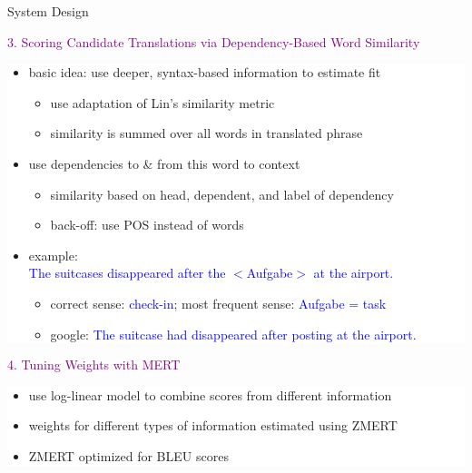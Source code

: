 \documentclass[final,t]{beamer}
\begin{document}
\begin{frame}{}
\begin{columns}[t]
\begin{column}{.47\linewidth}
\begin{block}{System Design}


\begin{center}
  \textcolor{purple}{3. Scoring Candidate Translations via Dependency-Based Word Similarity}
\end{center}

  \colorbox{white}{
\begin{minipage}{.90\linewidth}
  \begin{itemize}
  \item basic idea: use deeper, syntax-based information to estimate fit
    \begin{itemize}
    \item use adaptation of Lin's similarity metric
    \item similarity is summed over all words in translated phrase
    \end{itemize}
  \item use dependencies to \& from this word to context
    \begin{itemize}
    \item similarity based on head, dependent, and label of dependency 
    \item back-off: use POS instead of words
    \end{itemize}
  \item example: \\
    \textcolor{blue}{The suitcases disappeared after the $<$Aufgabe$>$ at the airport.}
    \begin{itemize}
    \item correct sense: \textcolor{blue}{check-in}; most frequent sense: \textcolor{blue}{Aufgabe = task}\\
    \item google: \textcolor{blue}{The suitcase had disappeared after posting at the airport.}
    \end{itemize}      
  \end{itemize}
\end{minipage}
}
\vspace{1cm}

\begin{center}
  \textcolor{purple}{4. Tuning Weights with MERT}
\end{center}

  \colorbox{white}{
\begin{minipage}{.90\linewidth}
  \begin{itemize}
  \item use log-linear model to combine scores from different information
  \item weights for different types of information estimated using ZMERT
  \item ZMERT optimized for BLEU scores
  \end{itemize}
\end{minipage}
}


\end{block}
\end{column}
\end{columns}
\end{frame}
\end{document}
